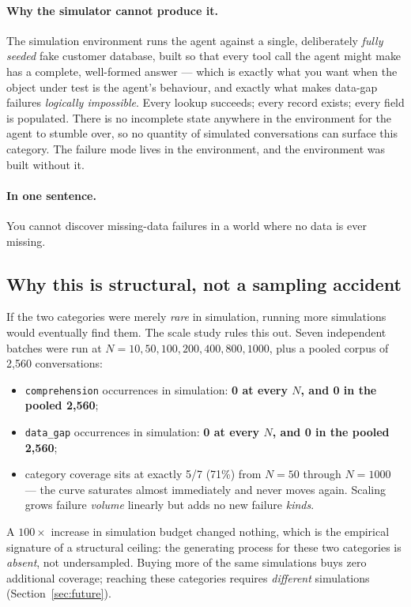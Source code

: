 \documentclass[11pt,a4paper]{article}
\newcommand{\cat}[1]{\texttt{#1}}
\begin{document}
\paragraph{Why the simulator cannot produce it.}
The simulation environment runs the agent against a single, deliberately \emph{fully seeded} fake
customer database, built so that every tool call the agent might make has a complete, well-formed
answer --- which is exactly what you want when the object under test is the agent's behaviour, and
exactly what makes data-gap failures \emph{logically impossible}. Every lookup succeeds; every
record exists; every field is populated. There is no incomplete state anywhere in the environment
for the agent to stumble over, so no quantity of simulated conversations can surface this
category. The failure mode lives in the environment, and the environment was built without it.

\paragraph{In one sentence.} You cannot discover missing-data failures in a world where no data is
ever missing.

\subsection{Why this is structural, not a sampling accident}

If the two categories were merely \emph{rare} in simulation, running more simulations would
eventually find them. The scale study rules this out. Seven independent batches were run at
$N = 10, 50, 100, 200, 400, 800, 1000$, plus a pooled corpus of 2{,}560 conversations:

\begin{itemize}[nosep]
  \item \cat{comprehension} occurrences in simulation: \textbf{0 at every $N$, and 0 in the pooled
        2{,}560};
  \item \cat{data\_gap} occurrences in simulation: \textbf{0 at every $N$, and 0 in the pooled
        2{,}560};
  \item category coverage sits at exactly 5/7 (71\%) from $N{=}50$ through $N{=}1000$ --- the
        curve saturates almost immediately and never moves again. Scaling grows failure
        \emph{volume} linearly but adds no new failure \emph{kinds}.
\end{itemize}

\noindent
A $100\times$ increase in simulation budget changed nothing, which is the empirical signature of a
structural ceiling: the generating process for these two categories is \emph{absent}, not
undersampled. Buying more of the same simulations buys zero additional coverage; reaching these
categories requires \emph{different} simulations (Section~\ref{sec:future}).
\end{document}
